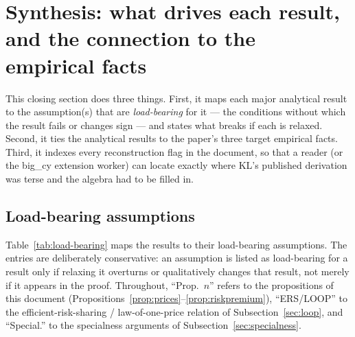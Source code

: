 \section{Synthesis: what drives each result, and the connection to the empirical facts}
\label{sec:synthesis}

This closing section does three things. First, it maps each major analytical
result to the assumption(s) that are \emph{load-bearing} for it --- the conditions
without which the result fails or changes sign --- and states what breaks if each
is relaxed. Second, it ties the analytical results to the paper's three target
empirical facts. Third, it indexes every reconstruction flag in the document, so
that a reader (or the big\_cy extension worker) can locate exactly where KL's
published derivation was terse and the algebra had to be filled in.

\subsection{Load-bearing assumptions}
\label{sec:load-bearing}

Table~\ref{tab:load-bearing} maps the results to their load-bearing assumptions.
The entries are deliberately conservative: an assumption is listed as load-bearing
for a result only if relaxing it overturns or qualitatively changes that result,
not merely if it appears in the proof. Throughout, ``Prop.~$n$'' refers to the
propositions of this document
(Propositions~\ref{prop:prices}--\ref{prop:riskpremium}), ``ERS/LOOP'' to the
efficient-risk-sharing / law-of-one-price relation of
Subsection~\ref{sec:loop}, and ``Special.'' to the specialness arguments of
Subsection~\ref{sec:specialness}.


